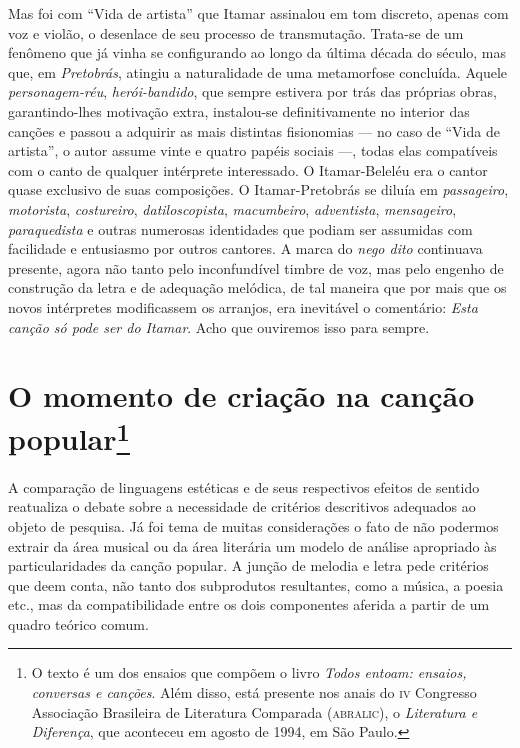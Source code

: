 Mas foi com ``Vida de artista'' que Itamar assinalou em tom discreto, apenas
com voz e violão, o desenlace de seu processo de transmutação. Trata-se
de um fenômeno que já vinha se configurando ao longo da última década do
século, mas que, em \textit{Pretobrás}, atingiu a naturalidade de uma metamorfose
concluída. Aquele \textit{personagem-réu}, \textit{herói-bandido}, que sempre estivera por
trás das próprias obras, garantindo-lhes motivação extra, instalou-se
definitivamente no interior das canções e passou a adquirir as mais
distintas fisionomias --- no caso de ``Vida de artista'', o autor assume vinte e quatro
papéis sociais ---, todas elas compatíveis com o canto de qualquer
intérprete interessado. O Itamar-Beleléu era o cantor quase exclusivo
de suas composições. O Itamar-Pretobrás se diluía em \textit{passageiro},
\textit{motorista}, \textit{costureiro}, \textit{datiloscopista}, \textit{macumbeiro},
\textit{adventista}, \textit{mensageiro}, \textit{paraquedista} e outras numerosas
identidades que podiam ser assumidas com facilidade e entusiasmo por
outros cantores. A marca do \textit{nego dito} continuava presente, agora não
tanto pelo inconfundível timbre de voz, mas pelo engenho de construção
da letra e de adequação melódica, de tal maneira que por mais que os
novos intérpretes modificassem os arranjos, era inevitável o comentário:
\textit{Esta canção só pode ser do Itamar}. Acho que ouviremos isso para
sempre.


\chapter{O momento de criação na canção popular\footnote{O texto é um dos ensaios que compõem o livro \textit{Todos entoam: ensaios, conversas e canções}. Além disso, está presente nos anais do \textsc{iv} Congresso Associação Brasileira de Literatura Comparada (\textsc{abralic}), o \textit{Literatura e Diferença}, que aconteceu em agosto de 1994, em São Paulo.}}


A comparação de linguagens estéticas e de seus respectivos efeitos de
sentido reatualiza o debate sobre a necessidade de critérios descritivos
adequados ao objeto de pesquisa. Já foi tema de muitas considerações o
fato de não podermos extrair da área musical ou da área literária um
modelo de análise apropriado às particularidades da canção popular. A
junção de melodia e letra pede critérios que deem conta, não tanto dos
subprodutos resultantes, como a música, a poesia etc., mas da
compatibilidade entre os dois componentes aferida a partir de um quadro
teórico comum.

